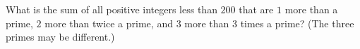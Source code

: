 What is the sum of all positive integers less than $200$ that are $1$ more than a prime, $2$ more than twice a prime, and $3$ more than $3$ times a prime? (The three primes may be different.)
